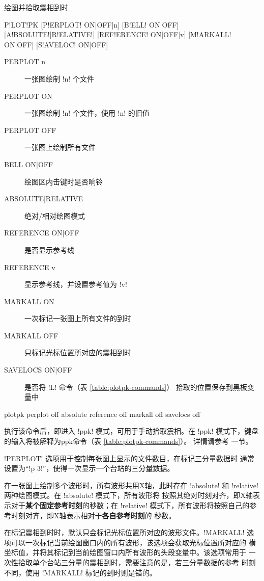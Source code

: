\label{cmd:plotpk}

绘图并拾取震相到时

\begin{SACSTX}
P!LOT!PK [P!ERPLOT! ON|OFF|n] [B!ELL! ON|OFF] [A!BSOLUTE!|R!ELATIVE!]
    [REF!ERENCE! ON|OFF|v] [M!ARKALL! ON|OFF] [S!AVELOC! ON|OFF]
\end{SACSTX}

\begin{description}
\item [PERPLOT n] 一张图绘制 !n! 个文件
\item [PERPLOT ON] 一张图绘制 !n! 个文件，使用 !n! 的旧值
\item [PERPLOT OFF] 一张图上绘制所有文件
\item [BELL ON|OFF] 绘图区内击键时是否响铃
\item [ABSOLUTE|RELATIVE] 绝对/相对绘图模式
\item [REFERENCE ON|OFF] 是否显示参考线
\item [REFERENCE v] 显示参考线，并设置参考值为 !v!
\item [MARKALL ON] 一次标记一张图上所有文件的到时
\item [MARKALL OFF] 只标记光标位置所对应的震相到时
\item [SAVELOCS ON|OFF] 是否将 !L! 命令（表 \ref{table:plotpk-commands}）
    拾取的位置保存到黑板变量中
\end{description}

\begin{SACDFT}
plotpk perplot off absolute reference off markall off savelocs off
\end{SACDFT}

执行该命令后，即进入 !ppk! 模式，可用于手动拾取震相。在 !ppk!
模式下，键盘的输入将被解释为ppk命令（表 \ref{table:plotpk-commands}）。
详情请参考  一节。

!PERPLOT! 选项用于控制每张图上显示的文件数目，在标记三分量数据时
通常设置为``!p 3!''，使得一次显示一个台站的三分量数据。

在一张图上绘制多个波形时，所有波形共用X轴，此时存在 !absolute! 和
!relative! 两种绘图模式。在 !absolute! 模式下，所有波形将
按照其绝对时刻对齐，即X轴表示对于\textbf{某个固定参考时刻}的秒数；在 !relative!
模式下，所有波形将按照自己的参考时刻对齐，即X轴表示相对于\textbf{各自参考时刻}的
秒数。

在标记震相到时时，默认只会标记光标位置所对应的波形文件。!MARKALL!
选项可以一次标记当前绘图窗口内的所有波形，该选项会获取光标位置所对应的
横坐标值，并将其标记到当前绘图窗口内所有波形的头段变量中。该选项常用于
一次性拾取单个台站三分量的震相到时，需要注意的是，若三分量数据的参考
时刻不同，使用 !MARKALL! 标记的到时则是错的。


